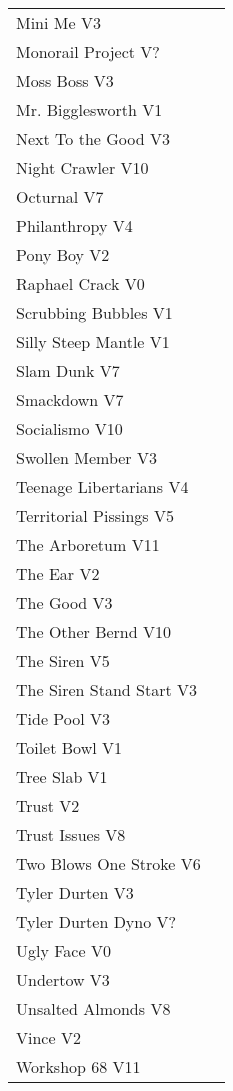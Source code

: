\begin{center}
\begin{supertabular}{lr}
Mini Me V3 & \pageref{rt:Mini Me} \\
Monorail Project V? & \pageref{rt:Monorail Project} \\
Moss Boss V3 & \pageref{rt:Moss Boss} \\
Mr. Bigglesworth V1 & \pageref{vr:Mr. Bigglesworth} \\
Next To the Good V3 & \pageref{rt:Next To the Good} \\
Night Crawler V10 & \pageref{rt:Night Crawler} \\
Octurnal V7 & \pageref{rt:Octurnal} \\
Philanthropy V4 & \pageref{rt:Philanthropy} \\
Pony Boy V2 & \pageref{rt:Pony Boy} \\
Raphael Crack V0 & \pageref{rt:Raphael Crack} \\
Scrubbing Bubbles V1 & \pageref{rt:Scrubbing Bubbles} \\
Silly Steep Mantle V1 & \pageref{rt:Silly Steep Mantle} \\
Slam Dunk V7 & \pageref{rt:Slam Dunk} \\
Smackdown V7 & \pageref{rt:Smackdown} \\
Socialismo V10 & \pageref{rt:Socialismo} \\
Swollen Member V3 & \pageref{rt:Swollen Member} \\
Teenage Libertarians V4 & \pageref{rt:Teenage Libertarians} \\
Territorial Pissings V5 & \pageref{rt:Territorial Pissings} \\
The Arboretum V11 & \pageref{rt:The Arboretum} \\
The Ear V2 & \pageref{rt:The Ear} \\
The Good V3 & \pageref{rt:The Good} \\
The Other Bernd V10 & \pageref{rt:The Other Bernd} \\
The Siren V5 & \pageref{rt:The Siren} \\
The Siren Stand Start V3 & \pageref{vr:The Siren Stand Start} \\
Tide Pool V3 & \pageref{rt:Tide Pool} \\
Toilet Bowl V1 & \pageref{rt:Toilet Bowl} \\
Tree Slab V1 & \pageref{rt:Tree Slab} \\
Trust V2 & \pageref{rt:Trust} \\
Trust Issues V8 & \pageref{rt:Trust Issues} \\
Two Blows One Stroke V6 & \pageref{rt:Two Blows One Stroke} \\
Tyler Durten V3 & \pageref{rt:Tyler Durten} \\
Tyler Durten Dyno V? & \pageref{vr:Tyler Durten Dyno} \\
Ugly Face V0 & \pageref{rt:Ugly Face} \\
Undertow V3 & \pageref{rt:Undertow} \\
Unsalted Almonds V8 & \pageref{rt:Unsalted Almonds} \\
Vince V2 & \pageref{rt:Vince} \\
Workshop 68 V11 & \pageref{rt:Workshop 68} \\
\end{supertabular}
\end{center}
